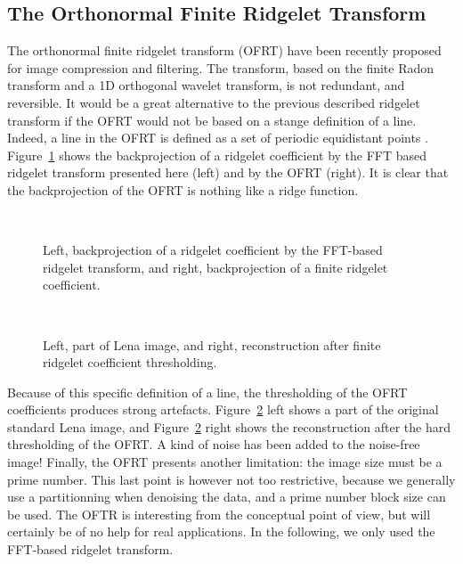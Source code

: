 \documentclass[11pt,a4paper]{article}
\begin{document}
\subsection{The Orthonormal Finite Ridgelet Transform}
The orthonormal finite ridgelet transform (OFRT)  have been recently proposed  
\cite{cur:do00,cur:do00b} for image compression and filtering. 
The transform, based on the finite Radon transform \cite{cur:matus93} and
a 1D orthogonal wavelet transform, is not redundant, and reversible.
It would be a great alternative to the previous described ridgelet transform
if the OFRT would not be based on a stange definition 
of a line. Indeed, a line in the OFRT is defined as 
a set of periodic equidistant points \cite{cur:matus93}. 
Figure~\ref{fig_cmp_backproj} shows the backprojection of a ridgelet 
coefficient by the FFT based ridgelet transform presented here (left) and by the 
 OFRT (right). It is clear that the backprojection
of the  OFRT is nothing like a ridge function.

\begin{figure}[htb]
\centerline{
\vbox{
\hbox{
}}}
\caption{Left, backprojection of a ridgelet coefficient by the 
FFT-based ridgelet transform,
and right, backprojection of a finite ridgelet coefficient.}
\label{fig_cmp_backproj}
\end{figure}

\begin{figure}[htb]
\centerline{
\vbox{
\hbox{
}}}
\caption{Left, part of Lena image,
and right, reconstruction after finite ridgelet coefficient thresholding.}
\label{fig_cmp_recl257}
\end{figure}

Because of this specific definition of a line, the thresholding of the OFRT
coefficients produces strong artefacts. 
Figure~\ref{fig_cmp_recl257} left shows a part 
of the original standard Lena image, and 
Figure~\ref{fig_cmp_recl257} right shows the reconstruction after the 
hard thresholding of the OFRT. A kind of noise has been added to the 
noise-free image!
Finally, the OFRT presents another limitation: the image size  
must be a prime number. This last point is however not too restrictive, 
because we generally use a partitionning when denoising the data, and a
prime number block size can be used. 
The OFTR is interesting from the conceptual point of view, but will
certainly be of no help for real applications. In the following, we 
only used the FFT-based ridgelet transform.
\end{document}
